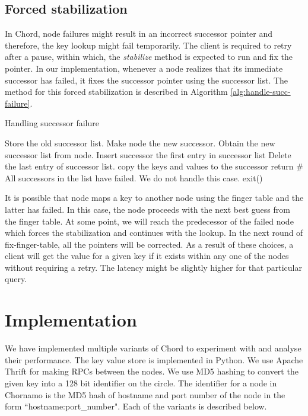 \documentclass{sig-alternate-10pt}
\begin{document}
\subsection{Forced stabilization}
In Chord, node failures might result in an incorrect successor pointer and therefore, the key lookup might fail temporarily. The client is required to retry after a pause, within which, the \textit{stabilize} method is expected to run and fix the pointer. In our implementation, whenever a node realizes that its immediate successor has failed, it fixes the successor pointer using the successor list. The method for this forced stabilization is described in Algorithm \ref{alg:handle-succ-failure}.
\begin{algorithm}[t]
\caption{Handling successor failure} \label{alg:handle-succ-failure}
\begin{algorithmic}
            \State Store the old successor list.
            \State Make node the new successor.
            \State Obtain the new successor list from node.
            \State Insert successor the first entry in successor list
            \State Delete the last entry of successor list.
                \State copy the keys and values to the successor
            \EndFor
            \State return
        \EndIf
    \EndFor
    \# All successors in the list have failed. We do not handle this case.
    \State exit()
\end{algorithmic}
\end{algorithm}

It is possible that node maps a key to another node using the finger table and the latter has failed. In this case, the node proceeds with the next best guess from the finger table. At some point, we will reach the predecessor of the failed node which forces the stabilization and continues with the lookup. In the next round of fix-finger-table, all the pointers will be corrected. As a result of these choices, a client will get the value for a given key if it exists within any one of the nodes without requiring a retry. The latency might be slightly higher for that particular query.

\section{Implementation}
We have implemented multiple variants of Chord to experiment with and analyse their performance. The key value store is implemented in Python. We use Apache Thrift \cite{thrift} for making RPCs between the nodes. We use MD5 hashing to convert the given key into a 128 bit identifier on the circle. The identifier for a node in Chornamo is the MD5 hash of hostname and port number of the node in the form ``hostname:port\_number". 
Each of the variants is described below.
\end{document}
